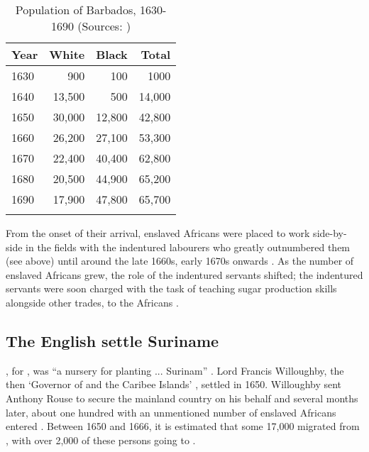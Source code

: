\begin{table}
\begin{tabular}{lrrr}
\lsptoprule 
{Year} & {White} & {Black} & {Total}\\
\midrule
1630 & 900 & 100 & 1000 \\
1640 & 13,500 & 500 & 14,000 \\
1650 & 30,000 & 12,800 & 42,800 \\
1660 & 26,200 & 27,100 & 53,300 \\
1670 & 22,400 & 40,400 & 62,800 \\
1680 & 20,500 & 44,900 & 65,200 \\
1690 & 17,900 & 47,800 & 65,700 \\
\lspbottomrule 
\end{tabular}
\caption{Population of Barbados, 1630-1690 (Sources: \citealt{Campbell77, Campbell84, McCusker91})\label{Table 6.1}}
\end{table}


From the onset of their arrival, enslaved Africans were placed to work side-by-side in the fields with the indentured labourers who greatly outnumbered them (see  above) until around the late 1660s, early 1670s onwards \citep{Davies74, Blackburn98, Galenson02, Elliott07, Bannet11}. As the number of enslaved Africans grew, the role of the  indentured servants shifted; the indentured servants were soon charged with the task of teaching sugar production skills alongside other trades, to the Africans \citep{Galenson02}.

\subsection{The English settle Suriname}\label{6.1.3}
, for , was ``a nursery for planting ... Surinam'' \citep{Sainsbury80}. Lord Francis Willoughby, the then `Governor of  and the Caribee Islands' \citep{Hotton74}, settled  in 1650. Willoughby sent Anthony Rouse to secure the mainland country on his behalf and several months later, about one hundred  with an unmentioned number of enslaved Africans entered  \citep{Kambel99}. Between 1650 and 1666, it is estimated that some 17,000  migrated from  \citep{Hornsby05}, with over 2,000 of these persons going to  \citep{Campbell86}.

